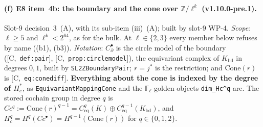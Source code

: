 \documentclass[11pt]{article}
\theoremstyle{remark}
\newcommand{\F}{\mathbb{F}}
\newcommand{\Z}{\mathbb{Z}}
\newcommand{\Fl}{\F_\ell}
\newcommand{\HA}[1]{[C,~\texttt{#1}]}      %
\begin{document}
\begingroup\sloppy %
\paragraph{(f) E8 item~4b: the boundary and the cone over $\Z/\ell^k$ (v1.10.0-pre.1).}
Slot-9 decision~3~(A), with its sub-item (iii)~(A); built by slot-9 WP-4. \emph{Scope}: $\ell\ge5$
and $\ell^k<2^{64}$, as for the bulk. At $\ell\in\{2,3\}$ every member below refuses by name
((b1), (b3)). \emph{Notation}: $C^{\bullet}_{\partial}$ is the circle model of the boundary
(\HA{def:pair}, \HA{prop:circlemodel}), the equivariant complex of $K_{\mathrm{bd}}$ in degrees
$0,1$, built by \texttt{SL2ZBoundaryPair}; $r=j^{\ast}$ is the restriction; and $\mathrm{Cone}(r)$
is \HA{eq:conediff}. \textbf{Everything about the cone is indexed by the degree of $H^{\ast}_c$},
as \texttt{EquivariantMappingCone} and the $\Fl$ golden objects \texttt{dim\_Hc\textasciicircum q}
are. The stored cochain group in degree $q$ is
$Cc^q:=\mathrm{Cone}(r)^{q-1}=C^q_{\mathrm{eq}}(K)\oplus C^{q-1}_{\mathrm{eq}}(K_{\mathrm{bd}})$, and
$H^q_c=H^q(Cc^{\bullet})=H^{q-1}(\mathrm{Cone}(r))$ for $q\in\{0,1,2\}$.
\end{document}
